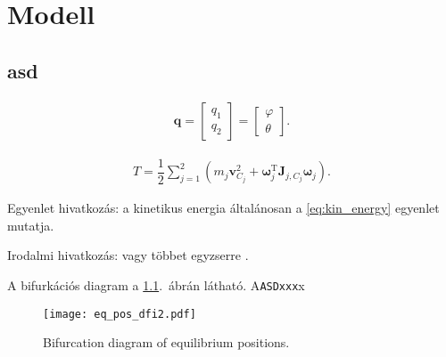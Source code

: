 \chapter{Modell} \label{chap:dynamics_of_Furuta_pend}

\section{asd}
\begin{align}
	\mathbf q = \begin{bmatrix}
		q_1\\
		q_2
	\end{bmatrix}
	=\begin{bmatrix}
		\varphi	\\
		\theta
	\end{bmatrix}.
\end{align}


\begin{align}
	T = \dfrac{1}{2}\sum_{j=1}^{2} \left( m_j \mathbf v_{C_j}^2 + \bm\omega_j^\mathrm{T} \mathbf J_{j,C_j} \bm\omega_j\right).
	\label{eq:kin_energy}
\end{align}


Egyenlet hivatkozás: a kinetikus energia általánosan a \eqref{eq:kin_energy} egyenlet mutatja.

Irodalmi hivatkozás: \cite{stepan2001vibrations} vagy többet egyzserre \cite{stepan1989retarded,stepan2001vibrations}.

A bifurkációs diagram a \ref{fig:eq_pos_dfi}.~ábrán látható. A\texttt{ASDxxx}x

\begin{figure}[bth]
	\centering
	\texttt{[image: eq\_pos\_dfi2.pdf]}
	\caption{Bifurcation diagram of equilibrium positions.}
	\label{fig:eq_pos_dfi}
\end{figure}



